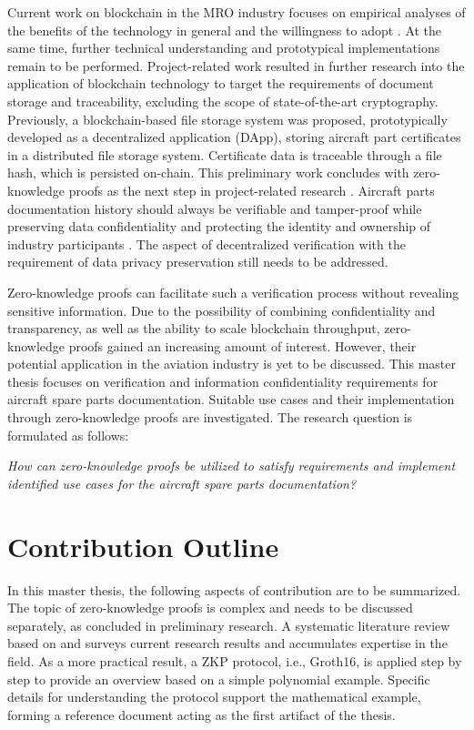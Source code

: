 Current work on blockchain in the MRO industry focuses on empirical analyses of the benefits of the technology in general and the willingness to adopt \citep{efthymiou}. At the same time, further technical understanding and prototypical implementations remain to be performed. Project-related work resulted in further research into the application of blockchain technology to target the requirements of document storage and traceability, excluding the scope of state-of-the-art cryptography. Previously, a blockchain-based file storage system was proposed, prototypically developed as a decentralized application (DApp), storing aircraft part certificates in a distributed file storage system. Certificate data is traceable through a file hash, which is persisted on-chain. This preliminary work concludes with zero-knowledge proofs as the next step in project-related research \citep{ZedelJ}. Aircraft parts documentation history should always be verifiable and tamper-proof while preserving data confidentiality and protecting the identity and ownership of industry participants \citep{Wickboldt2019BlockchainFW}. The aspect of decentralized verification with the requirement of data privacy preservation still needs to be addressed.

Zero-knowledge proofs can facilitate such a verification process without revealing sensitive information. Due to the possibility of combining confidentiality and transparency, as well as the ability to scale blockchain throughput, zero-knowledge proofs gained an increasing amount of interest. However, their potential application in the aviation industry is yet to be discussed. This master thesis focuses on verification and information confidentiality requirements for aircraft spare parts documentation. Suitable use cases and their implementation through zero-knowledge proofs are investigated. The research question is formulated as follows:

\begin{center}
\textit{How can zero-knowledge proofs be utilized to satisfy requirements and implement identified use cases for the aircraft spare parts documentation?}  
\end{center}

\section{Contribution Outline}
In this master thesis, the following aspects of contribution are to be summarized. The topic of zero-knowledge proofs is complex and needs to be discussed separately, as concluded in preliminary research. A systematic literature review based on \citet{vomBrockeJan2019TDgs} and \citet{Webster2002AnalyzingTP} surveys current research results and accumulates expertise in the field. As a more practical result, a ZKP protocol, i.e., Groth16, is applied step by step to provide an overview based on a simple polynomial example. Specific details for understanding the protocol support the mathematical example, forming a reference document acting as the first artifact of the thesis.

